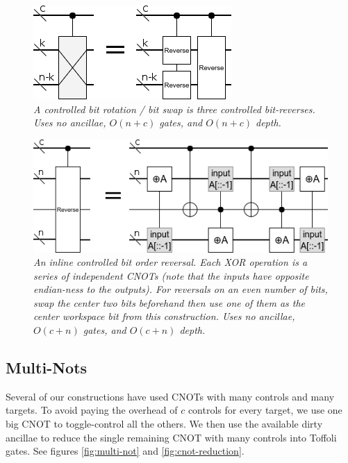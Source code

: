\documentclass[twocolumn]{article}
\begin{document}
\begin{figure}
  \centering
  \includegraphics[width=\linewidth]{assets/controlled-bit-rotate.png}
  \caption{\em
    A controlled bit rotation / bit swap is three controlled bit-reverses.
    Uses no ancillae, $O(n+c)$ gates, and $O(n+c)$ depth.
  }
  \label{fig:bit-rotate}
\end{figure}

\begin{figure}
  \centering
  \includegraphics[width=\linewidth]{assets/controlled-reverse.png}
  \caption{\em
    An inline controlled bit order reversal.
    Each XOR operation is a series of independent CNOTs (note that the inputs have opposite endian-ness to the outputs).
    For reversals on an even number of bits, swap the center two bits beforehand then use one of them as the center workspace bit from this construction.
    Uses no ancillae, $O(c + n)$ gates, and $O(c + n)$ depth.
  }
  \label{fig:bit-reverse}
\end{figure}


\subsection{Multi-Nots}

Several of our constructions have used CNOTs with many controls and many targets.
To avoid paying the overhead of $c$ controls for every target, we use one big CNOT to toggle-control all the others.
We then use the available dirty ancillae to reduce the single remaining CNOT with many controls into Toffoli gates.
See figures \ref{fig:multi-not} and \ref{fig:cnot-reduction}.
\end{document}
